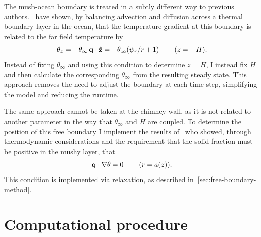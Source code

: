 \documentclass[11pt,twocolumn]{article}
\begin{document}
The mush-ocean boundary is treated in a subtly different way to previous authors.~\citet*{schulze-worster-98} have shown, by balancing advection and diffusion across a thermal boundary layer in the ocean, that the temperature gradient at this boundary is related to the far field temperature by
\begin{equation}
\label{eq:mush-ocean-bc}
\theta_z = - \theta_\infty \, \mathbf{q} \cdot \mathbf{\hat{z}} = - \theta_\infty (\psi_r/r + 1) \hspace{5ex} (z=-H).
\end{equation}
Instead of fixing $\theta_\infty$ and using this condition to determine $z=H$, I instead fix $H$ and then calculate the corresponding $\theta_\infty$ from the resulting steady state. This approach removes the need to adjust the boundary at each time step, simplifying the model and reducing the runtime.

The same approach cannot be taken at the chimney wall, as it is not related to another parameter in the way that $\theta_\infty$ and $H$ are coupled. To determine the position of this free boundary I implement the results of~\citet*{schulze-worster-99} who showed, through thermodynamic considerations and the requirement that the solid fraction must be positive in the mushy layer, that  
\begin{equation}
\label{eq:chimney-bc}
\mathbf{q} \cdot \nabla \theta = 0 \hspace{5ex} ( r=a(z) ).
\end{equation}
This condition is implemented via relaxation, as described in~\autoref{sec:free-boundary-method}.

\section{Computational procedure}
\label{sec:computational-procedure}
\end{document}
